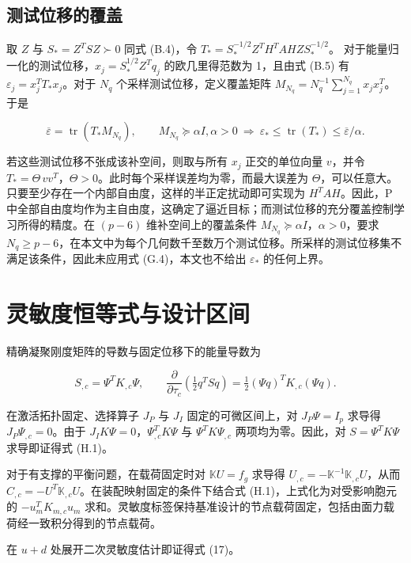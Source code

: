 \documentclass[preprint,12pt,authoryear]{elsarticle}
\begin{document}
\subsection{测试位移的覆盖}

取 \(Z\) 与 \(S_*=Z^TSZ\succ0\) 同式 (B.4)，令
\(T_*=S_*^{-1/2}Z^TH^TAHZ S_*^{-1/2}\)。
对于能量归一化的测试位移，\(x_j=S_*^{1/2}Z^Tq_j\) 的欧几里得范数为 1，且由式 (B.5) 有 \(\varepsilon_j=x_j^TT_*x_j\)。对于 \(N_q\) 个采样测试位移，定义覆盖矩阵 \(M_{N_q}=N_q^{-1}\sum_{j=1}^{N_q}x_jx_j^T\)。于是

\[
\overline\varepsilon=\operatorname{tr}(T_*M_{N_q}),\qquad
M_{N_q}\succeq\alpha I, \alpha>0
\ \Longrightarrow\ 
\varepsilon_*\le\operatorname{tr}(T_*)\le\overline\varepsilon/\alpha.
\tag{G.4}
\]

若这些测试位移不张成该补空间，则取与所有 \(x_j\) 正交的单位向量 \(v\)，并令 \(T_*=\Theta\,vv^T\)，\(\Theta>0\)。此时每个采样误差均为零，而最大误差为 \(\Theta\)，可以任意大。只要至少存在一个内部自由度，这样的半正定扰动即可实现为 \(H^TAH\)。因此，P 中全部自由度均作为主自由度，这确定了逼近目标；而测试位移的充分覆盖控制学习所得的精度。在 \((p-6)\) 维补空间上的覆盖条件 \(M_{N_q}\succeq\alpha I\)，\(\alpha>0\)，要求 \(N_q\ge p-6\)，在本文中为每个几何数千至数万个测试位移。所采样的测试位移集不满足该条件，因此未应用式 (G.4)，本文也不给出 \(\varepsilon_*\) 的任何上界。

\section{灵敏度恒等式与设计区间}

精确凝聚刚度矩阵的导数与固定位移下的能量导数为

\[
S_{,c}=\Psi^TK_{,c}\Psi,\qquad
\frac{\partial}{\partial\tau_c}\left(\tfrac12q^TSq\right)
=\tfrac12(\Psi q)^TK_{,c}(\Psi q).
\tag{H.1}
\]

在激活拓扑固定、选择算子 \(J_P\) 与 \(J_I\) 固定的可微区间上，对 \(J_P\Psi=I_p\) 求导得 \(J_P\Psi_{,c}=0\)。由于 \(J_IK\Psi=0\)，\(\Psi_{,c}^TK\Psi\) 与 \(\Psi^TK\Psi_{,c}\) 两项均为零。因此，对 \(S=\Psi^TK\Psi\) 求导即证得式 (H.1)。

对于有支撑的平衡问题，在载荷固定时对 \(\mathbb K U=f_g\) 求导得 \(U_{,c}=-\mathbb K^{-1}\mathbb K_{,c}U\)，从而 \(C_{,c}=-U^T\mathbb K_{,c}U\)。在装配映射固定的条件下结合式 (H.1)，上式化为对受影响胞元的 \(-u_m^TK_{m,c}u_m\) 求和。灵敏度标签保持基准设计的节点载荷固定，包括由面力载荷经一致积分得到的节点载荷。

在 \(u+d\) 处展开二次灵敏度估计即证得式 (17)。
\end{document}
